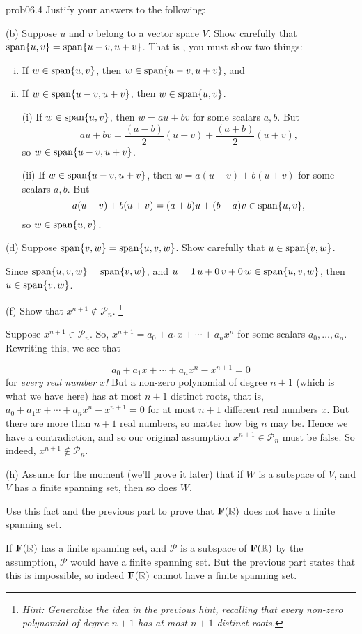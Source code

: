 \begin{sol}{prob06.4} Justify your answers to the following:
\medskip

(b) Suppose $u$ and $v$ belong to a vector space $V$. Show carefully that $\textrm{span}\{u,v\}=\textrm{span}\{u-v, u+v\}$. That is , you must show two things:
\begin{enumerate}[(i)]
\item If $w\in \textrm{span}\{u,v\}$, then $w \in \textrm{span}\{u-v, u+v\}$, and
\item If $w\in \textrm{span}\{u-v, u+v\}$,  then $w\in \textrm{span}\{u,v\} $.


\soln (i) If $w\in \textrm{span}\{u,v\}$, then $w=au+bv$ for some scalars $a,b$. But $$au+bv=\dfrac{(a-b)}2 (u-v) +\dfrac{(a+b)}2 (u+v),$$ so $w \in \textrm{span}\{u-v, u+v\}$. 

(ii) If $w\in \textrm{span}\{u-v, u+v\}$, then   $w=a(u-v)+b(u+v)$ for some scalars $a,b$. But $$a(u-v)+b(u+v)=(a+b)u + (b-a)v \in \textrm{span}\{u,v\},$$ so $w\in \textrm{span}\{u,v\}$.

\end{enumerate}
\medskip
%

(d) Suppose $\textrm{span}\{v,w\}=\textrm{span}\{u,v,w\}$. Show carefully that $u \in \textrm{span}\{v,w\}$. 

\soln Since $\textrm{span}\{u,v,w\}=\textrm{span}\{v,w\}$, and $u=1\, u +0\,v +0\, w\in \textrm{span}\{u,v,w\}$, then $u \in \textrm{span}\{v,w\}$.
\medskip

(f)  Show that $x^{n+1} \notin \mathcal P_n$. \footnote{\it  Hint: Generalize the idea in the previous hint, recalling that every non-zero polynomial of degree $n+1$ has at most $n+1$ distinct roots.}

\soln Suppose $x^{n+1} \in \mathcal P_n$. So, $x^{n+1}=a_0 + a_1 x + \cdots + a_nx^n$ for some scalars $a_0, \dots, a_n$. Rewriting this, we see that

$$ a_0 + a_1 x + \cdots + a_nx^n - x^{n+1}=0$$ for {\it every real number $x$!} But a non-zero polynomial of degree $n+1$ (which is what we have here) has at most $n+1$ distinct roots, that is, $ a_0 + a_1 x + \cdots + a_nx^n - x^{n+1}=0$ for at most $n+1$ different real numbers $x$.  But there are more than $n+1$ real numbers, so matter how big $n$ may be. Hence we have a contradiction, and so our original assumption $x^{n+1} \in \mathcal P_n$ must be false. So indeed, $x^{n+1} \notin \mathcal P_n$.
\medskip

(h) Assume for the moment (we'll prove it later) that if $W$ is a subspace of $V$, and $V$ has a finite spanning set, then so does $W$. 
  
Use this fact and the previous part to prove that $\mathbf{F}(\mathbb{R})$ does not have a finite spanning set.
 
\soln If $\mathbf{F}(\mathbb{R})$ has a finite spanning set, and $\mathcal P$ is a subspace of $\mathbf{F}(\mathbb{R})$  by the assumption,  $\mathcal P$ would have a finite spanning set. But the previous part states that this is impossible, so indeed $\mathbf{F}(\mathbb{R})$ cannot have a finite spanning set.
\medskip 
%



\end{sol}

